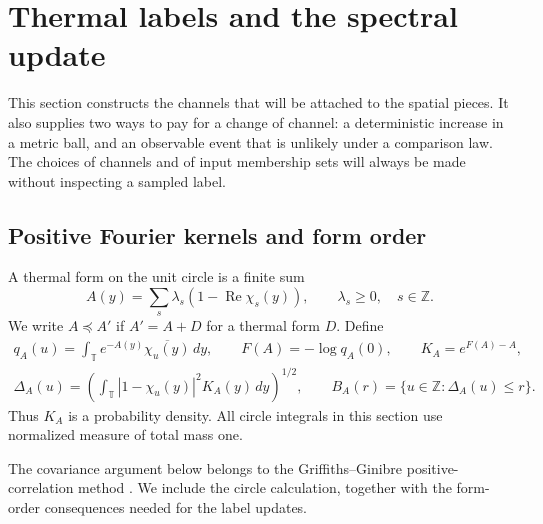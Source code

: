 \section{Thermal labels and the spectral update}\label{sec:thermal}

This section constructs the channels that will be attached to the spatial
pieces.  It also supplies two ways to pay for a change of channel: a
deterministic increase in a metric ball, and an observable event that is
unlikely under a comparison law.  The choices of channels and of input
membership sets will always be made without inspecting a sampled label.

\subsection{Positive Fourier kernels and form order}

\begin{definition}
A thermal form on the unit circle is a finite sum
\[
 A(y)=\sum_s\lambda_s(1-\operatorname{Re}\chi_s(y)),
 \qquad \lambda_s\ge0,\quad s\in\mathbb Z.
\]
We write $A\preceq A'$ if $A'=A+D$ for a thermal form $D$.  Define
\begin{equation}\label{eq:thermal-definitions}
 \begin{gathered}
 q_A(u)=\int_{\mathbb T}e^{-A(y)}\overline{\chi_u(y)}\,dy,
 \qquad F(A)=-\log q_A(0),\qquad K_A=e^{F(A)-A},\\
 \Delta_A(u)=\left(\int_{\mathbb T}|1-\chi_u(y)|^2K_A(y)\,dy\right)^{1/2},
 \qquad B_A(r)=\{u\in\mathbb Z:\Delta_A(u)\le r\}.
 \end{gathered}
\end{equation}
Thus $K_A$ is a probability density.  All circle integrals in this section
use normalized measure of total mass one.
\end{definition}

The covariance argument below belongs to the Griffiths--Ginibre
positive-correlation method \cite{Ginibre1970}. We include the circle
calculation, together with the form-order consequences needed for the
label updates.

